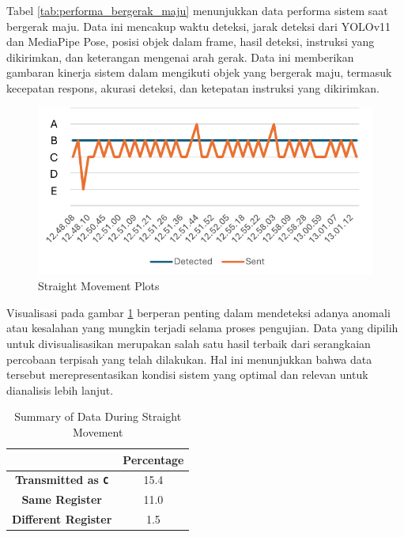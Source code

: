 Tabel \ref{tab:performa_bergerak_maju} menunjukkan data performa sistem saat bergerak maju. Data ini mencakup waktu deteksi, jarak deteksi dari YOLOv11 dan MediaPipe Pose, posisi objek dalam frame, hasil deteksi, instruksi yang dikirimkan, dan keterangan mengenai arah gerak. Data ini memberikan gambaran kinerja sistem dalam mengikuti objek yang bergerak maju, termasuk kecepatan respons, akurasi deteksi, dan ketepatan instruksi yang dikirimkan.

\begin{figure}[H]
    \centering
    \includegraphics[width=1\textwidth]{gambar/tex/forward.pdf}
    \caption{Straight Movement Plots}
    \label{fig:straight_movement_plots}
\end{figure}

Visualisasi pada gambar \ref{fig:straight_movement_plots} berperan penting dalam mendeteksi adanya anomali atau kesalahan yang mungkin terjadi selama proses pengujian. Data yang dipilih untuk divisualisasikan merupakan salah satu hasil terbaik dari serangkaian percobaan terpisah yang telah dilakukan. Hal ini menunjukkan bahwa data tersebut merepresentasikan kondisi sistem yang optimal dan relevan untuk dianalisis lebih lanjut.

\begin{table}[H]
    \centering
    \caption{Summary of Data During Straight Movement}
    \label{tab:straight_movement_data_transmission_detection}
    \begin{tabular}{|c|c|}
        \hline 
        \cellcolor[HTML]{000000} & \cellcolor[HTML]{C0C0C0} \textbf{Percentage}   \\ \hline
        \cellcolor[HTML]{C0C0C0} \textbf{Transmitted as \texttt{C}} & 15.4  \\ \hline
        \cellcolor[HTML]{C0C0C0} \textbf{Same Register}  & 11.0  \\ \hline
        \cellcolor[HTML]{C0C0C0} \textbf{Different Register}   & 1.5  \\ \hline
    \end{tabular}
\end{table}

